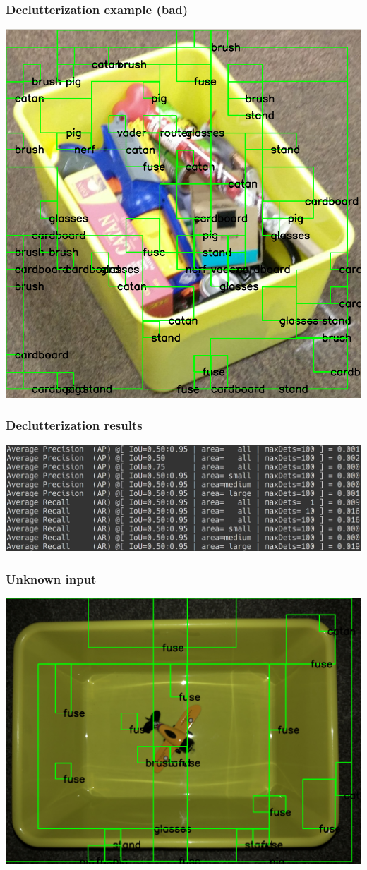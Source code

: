 \documentclass{beamer}
\begin{document}
\begin{frame}
  \frametitle{Declutterization example (bad)}
  \includegraphics[height=.7\textwidth]{testResults2.png}
\end{frame}

\begin{frame}
  \frametitle{Declutterization results}
  \includegraphics[width=\textwidth]{testScore.png}
\end{frame}

\begin{frame}
  \frametitle{Unknown input}
  \includegraphics[width=\textwidth]{unknown1.png}
\end{frame}
\end{document}
